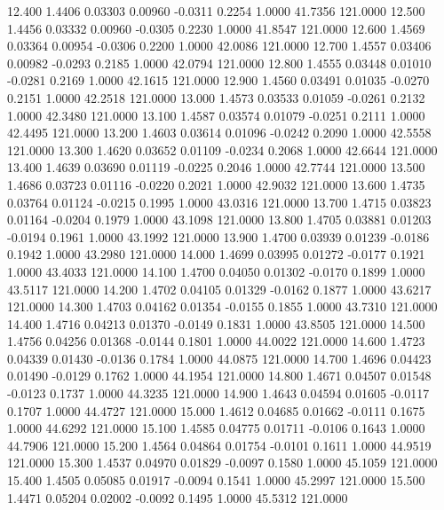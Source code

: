   12.400   1.4406   0.03303   0.00960  -0.0311   0.2254   1.0000  41.7356 121.0000
  12.500   1.4456   0.03332   0.00960  -0.0305   0.2230   1.0000  41.8547 121.0000
  12.600   1.4569   0.03364   0.00954  -0.0306   0.2200   1.0000  42.0086 121.0000
  12.700   1.4557   0.03406   0.00982  -0.0293   0.2185   1.0000  42.0794 121.0000
  12.800   1.4555   0.03448   0.01010  -0.0281   0.2169   1.0000  42.1615 121.0000
  12.900   1.4560   0.03491   0.01035  -0.0270   0.2151   1.0000  42.2518 121.0000
  13.000   1.4573   0.03533   0.01059  -0.0261   0.2132   1.0000  42.3480 121.0000
  13.100   1.4587   0.03574   0.01079  -0.0251   0.2111   1.0000  42.4495 121.0000
  13.200   1.4603   0.03614   0.01096  -0.0242   0.2090   1.0000  42.5558 121.0000
  13.300   1.4620   0.03652   0.01109  -0.0234   0.2068   1.0000  42.6644 121.0000
  13.400   1.4639   0.03690   0.01119  -0.0225   0.2046   1.0000  42.7744 121.0000
  13.500   1.4686   0.03723   0.01116  -0.0220   0.2021   1.0000  42.9032 121.0000
  13.600   1.4735   0.03764   0.01124  -0.0215   0.1995   1.0000  43.0316 121.0000
  13.700   1.4715   0.03823   0.01164  -0.0204   0.1979   1.0000  43.1098 121.0000
  13.800   1.4705   0.03881   0.01203  -0.0194   0.1961   1.0000  43.1992 121.0000
  13.900   1.4700   0.03939   0.01239  -0.0186   0.1942   1.0000  43.2980 121.0000
  14.000   1.4699   0.03995   0.01272  -0.0177   0.1921   1.0000  43.4033 121.0000
  14.100   1.4700   0.04050   0.01302  -0.0170   0.1899   1.0000  43.5117 121.0000
  14.200   1.4702   0.04105   0.01329  -0.0162   0.1877   1.0000  43.6217 121.0000
  14.300   1.4703   0.04162   0.01354  -0.0155   0.1855   1.0000  43.7310 121.0000
  14.400   1.4716   0.04213   0.01370  -0.0149   0.1831   1.0000  43.8505 121.0000
  14.500   1.4756   0.04256   0.01368  -0.0144   0.1801   1.0000  44.0022 121.0000
  14.600   1.4723   0.04339   0.01430  -0.0136   0.1784   1.0000  44.0875 121.0000
  14.700   1.4696   0.04423   0.01490  -0.0129   0.1762   1.0000  44.1954 121.0000
  14.800   1.4671   0.04507   0.01548  -0.0123   0.1737   1.0000  44.3235 121.0000
  14.900   1.4643   0.04594   0.01605  -0.0117   0.1707   1.0000  44.4727 121.0000
  15.000   1.4612   0.04685   0.01662  -0.0111   0.1675   1.0000  44.6292 121.0000
  15.100   1.4585   0.04775   0.01711  -0.0106   0.1643   1.0000  44.7906 121.0000
  15.200   1.4564   0.04864   0.01754  -0.0101   0.1611   1.0000  44.9519 121.0000
  15.300   1.4537   0.04970   0.01829  -0.0097   0.1580   1.0000  45.1059 121.0000
  15.400   1.4505   0.05085   0.01917  -0.0094   0.1541   1.0000  45.2997 121.0000
  15.500   1.4471   0.05204   0.02002  -0.0092   0.1495   1.0000  45.5312 121.0000
